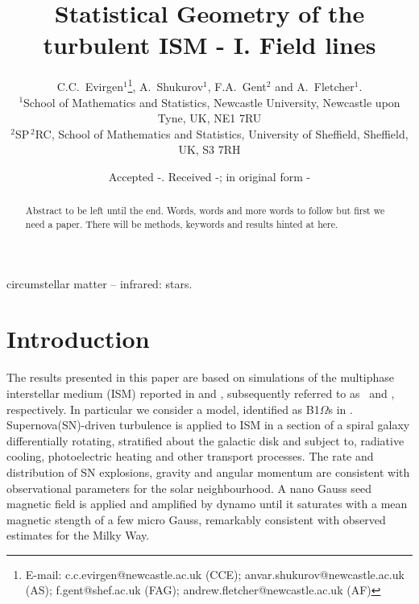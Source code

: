 \documentclass[useAMS,usenatbib]{mn2e}
\title[Statistical Geometry of the turbulent multi-phase ISM - I. Field lines]{Statistical Geometry of the turbulent ISM - I. Field lines}
\author[C. C.~Evirgen, A.~Shukurov, F.A. Gent and A.~Fletcher]{C.C.~Evirgen$^{1}$\thanks{E-mail:
c.c.evirgen@newcastle.ac.uk (CCE); anvar.shukurov@newcastle.ac.uk (AS); 
f.gent@shef.ac.uk (FAG); andrew.fletcher@newcastle.ac.uk (AF)}, A.~Shukurov$^{1}$, F.A.~Gent$^{2}$ and A.~Fletcher$^{1}$.\\%
$^{1}$School of Mathematics and Statistics, Newcastle University,
Newcastle upon Tyne, UK, NE1 7RU\\
$^{2}$SP$^{\,2}$\!RC, School of Mathematics and Statistics, University of Sheffield, 
Sheffield, UK, S3 7RH}
\begin{document}
\newcommand{\bvec}[1]{\boldsymbol{#1}}
\newcommand{\avg}[1]{\left<\bvec{#1}\right>_{l}}
\date{Accepted -. Received -; in original form -}

\pagerange{\pageref{firstpage}--\pageref{lastpage}} 

\maketitle

\label{firstpage}

\begin{abstract}
Abstract to be left until the end. Words, words and more words to follow but first we need a paper. There will be methods, keywords and results hinted at here. 
\end{abstract}

\begin{keywords}
circumstellar matter -- infrared: stars.
\end{keywords}

\section{Introduction}
The results presented in this paper are based on simulations of the multiphase 
interstellar medium (ISM) reported in \citet{GSFSM13} and \citet{GSSFM13}, %
subsequently referred to as \HD\, and \MHD, respectively.
In particular we consider a model, identified as B1$\Omega$s in \MHD.
Supernova(SN)-driven turbulence is applied to ISM in a section of a spiral
galaxy differentially rotating, stratified about the galactic disk and subject
to, radiative cooling, photoelectric heating and other transport processes.
The rate and distribution of SN explosions, gravity and angular momentum are 
consistent with observational parameters for the solar neighbourhood.
A nano Gauss seed magnetic field is applied and amplified by dynamo until it
saturates with a mean magnetic stength of a few micro Gauss, remarkably 
consistent with observed estimates for the Milky Way.
\end{document}
